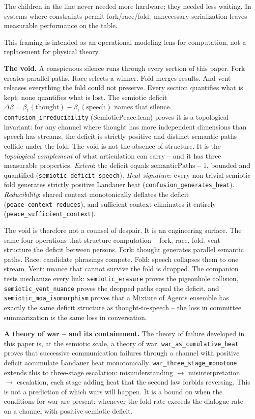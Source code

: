 \documentclass[
  11pt,
]{article}
\newcounter{none} %
\begin{document}
The children in the line never needed more hardware; they needed less
waiting. In systems where constraints permit fork/race/fold, unnecessary
serialization leaves measurable performance on the table.

This framing is intended as an operational modeling lens for
computation, not a replacement for physical theory.

\textbf{The void.} A conspicuous silence runs through every section of
this paper. Fork creates parallel paths. Race selects a winner. Fold
merges results. And vent releases everything the fold could not
preserve. Every section quantifies what is kept; none quantifies what is
lost. The semiotic deficit
\(\Delta\beta = \beta_1(\text{thought}) - \beta_1(\text{speech})\) names
that silence. \texttt{confusion\_irreducibility} (SemioticPeace.lean)
proves it is a topological invariant: for any channel where thought has
more independent dimensions than speech has streams, the deficit is
strictly positive and distinct semantic paths collide under the fold.
The void is not the absence of structure. It is the \emph{topological
complement} of what articulation can carry -- and it has three
measurable properties. \emph{Extent}: the deficit equals
\(\text{semanticPaths} - 1\), bounded and quantified
(\texttt{semiotic\_deficit\_speech}). \emph{Heat signature}: every
non-trivial semiotic fold generates strictly positive Landauer heat
(\texttt{confusion\_generates\_heat}). \emph{Reducibility}: shared
context monotonically deflates the deficit
(\texttt{peace\_context\_reduces}), and sufficient context eliminates it
entirely (\texttt{peace\_sufficient\_context}).

The void is therefore not a counsel of despair. It is an engineering
surface. The same four operations that structure computation -- fork,
race, fold, vent -- structure the deficit between persons. Fork: thought
generates parallel semantic paths. Race: candidate phrasings compete.
Fold: speech collapses them to one stream. Vent: nuance that cannot
survive the fold is dropped. The companion tests mechanize every link:
\texttt{semiotic\_erasure} proves the pigeonhole collision,
\texttt{semiotic\_vent\_nuance} proves the dropped paths equal the
deficit, and \texttt{semiotic\_moa\_isomorphism} proves that a Mixture
of Agents ensemble has exactly the same deficit structure as
thought-to-speech -- the loss in committee summarization is the same
loss in conversation.

\textbf{A theory of war -- and its containment.} The theory of failure
developed in this paper is, at the semiotic scale, a theory of war.
\texttt{war\_as\_cumulative\_heat} proves that successive communication
failures through a channel with positive deficit accumulate Landauer
heat monotonically. \texttt{war\_three\_stage\_monotone} extends this to
three-stage escalation: misunderstanding \(\to\) misinterpretation
\(\to\) escalation, each stage adding heat that the second law forbids
reversing. This is not a prediction of which wars will happen. It is a
bound on when the conditions for war are present: whenever the fold rate
exceeds the dialogue rate on a channel with positive semiotic deficit.
\end{document}
